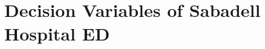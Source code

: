 \documentclass[11pt]{article} %
\begin{document}



\section{Decision Variables of Sabadell Hospital ED}
\end{document}
